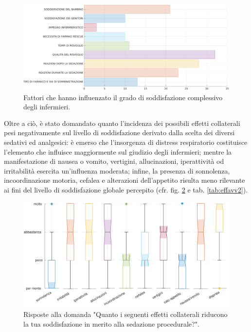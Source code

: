 \begin{figure}[!h]
    \centering
    \includegraphics[width=1\textwidth]{Figure/soddisfazione-globale.eps}
    \caption{Fattori che hanno influenzato il grado di soddisfazione complessivo degli infermieri.} %
    \label{fig:soddglobale}
\end{figure}

\newpage
Oltre a ciò, è stato domandato quanto l'incidenza dei possibili effetti collaterali pesi negativamente sul livello di soddisfazione derivato dalla scelta dei diversi sedativi ed analgesici: è emerso che l'insorgenza di distress respiratorio costituisce l'elemento che influisce maggiormente sul giudizio degli infermieri; mentre la manifestazione di nausea o vomito, vertigini, allucinazioni, iperattività od irritabilità esercita un'influenza moderata; infine, la presenza di sonnolenza, incoordinazione motoria, cefalea e alterazioni dell'appetito risulta meno rilevante ai fini del livello di soddisfazione globale percepito (cfr. fig. \ref{fig:influenzaeffetti} e tab. \ref{tab:effavv2}). 

\vfill

\begin{figure}[!ht]
    \centering
    \includegraphics[width=1\textwidth]{Figure/influenza-effetti.pdf}
    \caption{Risposte alla domanda "Quanto i seguenti effetti collaterali riducono la tua soddisfazione in merito alla sedazione procedurale?".}%
    \label{fig:influenzaeffetti}
\end{figure}

